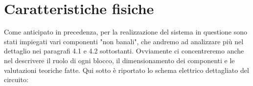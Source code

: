 \documentclass[12pt,a4paper]{article}
\begin{document}

\section{Caratteristiche fisiche}

    Come anticipato in precedenza, per la realizzazione del sistema in questione sono stati impiegati vari componenti "non banali", che andremo
    ad analizzare più nel dettaglio nei paragrafi 4.1 e 4.2 sottostanti. Ovviamente ci concentreremo anche nel descrivere il ruolo
    di ogni blocco, il dimensionamento dei componenti e le valutazioni teoriche fatte. Qui sotto è riportato lo schema elettrico dettagliato del
    circuito:

\end{document}
